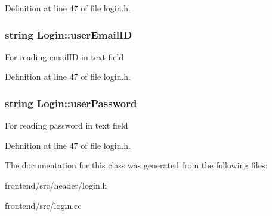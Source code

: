 \-Definition at line 47 of file login.\-h.

\hypertarget{classLogin_aa83b4706e0f0f0afc65f210ee8e4839a}{
\subsubsection[{user\-Email\-I\-D}]{\setlength{\rightskip}{0pt plus 5cm}string {\bf \-Login\-::user\-Email\-I\-D}}}\label{dd/dfd/classLogin_aa83b4706e0f0f0afc65f210ee8e4839a}
\-For reading email\-I\-D in text field 

\-Definition at line 47 of file login.\-h.

\hypertarget{classLogin_a9731be126468f535f161f045c95687c6}{
\subsubsection[{user\-Password}]{\setlength{\rightskip}{0pt plus 5cm}string {\bf \-Login\-::user\-Password}}}\label{dd/dfd/classLogin_a9731be126468f535f161f045c95687c6}
\-For reading password in text field 

\-Definition at line 47 of file login.\-h.



\-The documentation for this class was generated from the following files\-:\begin{DoxyCompactItemize}
\item 
frontend/src/header/login.\-h\item 
frontend/src/login.\-cc\end{DoxyCompactItemize}
